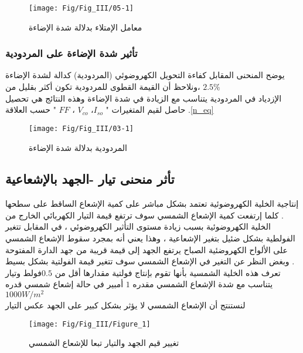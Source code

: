 \begin{figure}[h!]
 	\centering
 	\texttt{[image: Fig/Fig\_III/05-1]}
 	\caption{معامل الإمتلاء بدلالة شدة الإضاءة}
 	\label{fig:05-1}
 \end{figure}
 \FloatBarrier
 \subsubsection{ تأثير شدة الإضاءة  على  المردودية}
 يوضح المنحنى المقابل كفاءة التحويل الكهروضوئي (المردودية) كدالة لشدة الإضاءة ،ونلاحظ أن القيمة القطوى للمردودية تكون أكثر بقليل  من $ 2.5\%   $  \\
 الإزدياد في المردودية يتناسب مع الزيادة في شدة الإضاءة وهذه النتائج هي تحصيل حاصل لقيم المتغيرات "  $ I_{so} $،  $ V_{co} $
 ، $ FF $ " 
 حسب العلاقة .\ref{n_eq} 
 \begin{figure}[h!]
 	\centering
 	\texttt{[image: Fig/Fig\_III/03-1]}
 	\caption{المردودية بدلالة  شدة الإضاءة}
 	\label{fig:03-1}
 \end{figure}
 \FloatBarrier
 
 \subsection{ تأثر منحنى تيار -الجهد بالإشعاعية }
 إنتاجية الخلية الكهروضوئية تعتمد بشكل مباشر على كمية الإشعاع الساقط على سطحها . كلما إرتفعت كمية الإشعاع الشمسي سوف ترتفع قيمة التيار الكهربائي الخارج من الخلية الكهروضوئية بسبب زيادة مستوى التأثير الكهروضوئي ، في المقابل تتغير الفولطية بشكل ضئيل بتغير الإشعاعية ، وهذا يعني أنه بمجرد سقوط الإشعاع الشمسي  على الألواح الكهروضئية  الصباح يرتفع الجهد إلى قيمة قريبة من جهد الدارة المفتوحة وبغض النظر عن التغير في الإشعاع الشمسي سوف تتغير قيمة  الفولتية بشكل بسيط . \\
 تعرف هذه الخلية الشمسية بأنها تقوم بإنتاج فولتية مقدارها أقل من  $ 0.5  $فولط وتيار يتناسب مع شدة الإشعاع الشمسي مقدره $ 1 $ أمبير في حالة إشعاع شمسي قدره $ 1000W/m^2 $ \\
 لنستنتج أن الإشعاع الشمسي لا يؤثر بشكل كبير على الجهد عكس التيار 
 \begin{figure}[h!] 
 	\centering
 	\texttt{[image: Fig/Fig\_III/Figure\_1]}
 	\caption{ تغيير قيم الجهد والتيار تبعا للإشعاع الشمسي}
 	\label{fig:figure1}
 \end{figure}
 \FloatBarrier
